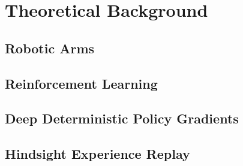 \chapter{Theoretical Background}



\section{Robotic Arms}




\section{Reinforcement Learning}









\section{Deep Deterministic Policy Gradients}




\section{Hindsight Experience Replay}
